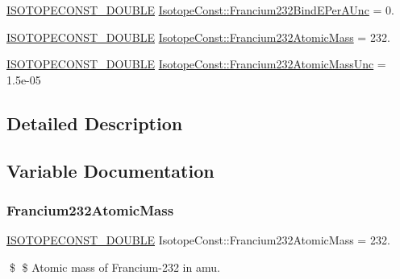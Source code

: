 \begin{DoxyCompactItemize}
\mbox{\hyperlink{group___isotope_const-_macros_ga8f45a7272ce02c0b4c65c44636ed719a}{I\+S\+O\+T\+O\+P\+E\+C\+O\+N\+S\+T\+\_\+\+D\+O\+U\+B\+LE}} \mbox{\hyperlink{group___isotope_const-_francium-_fr232_gab1cbd77abdbd51b53bbff6f0607d6698}{Isotope\+Const\+::\+Francium232\+Bind\+E\+Per\+A\+Unc}} = 0.
\item 
\mbox{\hyperlink{group___isotope_const-_macros_ga8f45a7272ce02c0b4c65c44636ed719a}{I\+S\+O\+T\+O\+P\+E\+C\+O\+N\+S\+T\+\_\+\+D\+O\+U\+B\+LE}} \mbox{\hyperlink{group___isotope_const-_francium-_fr232_gabc50caf933657f766ad73d1f522083d9}{Isotope\+Const\+::\+Francium232\+Atomic\+Mass}} = 232.
\item 
\mbox{\hyperlink{group___isotope_const-_macros_ga8f45a7272ce02c0b4c65c44636ed719a}{I\+S\+O\+T\+O\+P\+E\+C\+O\+N\+S\+T\+\_\+\+D\+O\+U\+B\+LE}} \mbox{\hyperlink{group___isotope_const-_francium-_fr232_ga678ead063f3024c33d30f263fce6640c}{Isotope\+Const\+::\+Francium232\+Atomic\+Mass\+Unc}} = 1.\+5e-\/05
\end{DoxyCompactItemize}


\subsection{Detailed Description}


\subsection{Variable Documentation}
\mbox{\label{group___isotope_const-_francium-_fr232_gabc50caf933657f766ad73d1f522083d9}} 
\subsubsection{\texorpdfstring{Francium232\+Atomic\+Mass}{Francium232AtomicMass}}
{\footnotesize\ttfamily \mbox{\hyperlink{group___isotope_const-_macros_ga8f45a7272ce02c0b4c65c44636ed719a}{I\+S\+O\+T\+O\+P\+E\+C\+O\+N\+S\+T\+\_\+\+D\+O\+U\+B\+LE}} Isotope\+Const\+::\+Francium232\+Atomic\+Mass = 232.}

\$ \$ Atomic mass of Francium-\/232 in amu. \mbox{\label{group___isotope_const-_francium-_fr232_ga678ead063f3024c33d30f263fce6640c}} 
